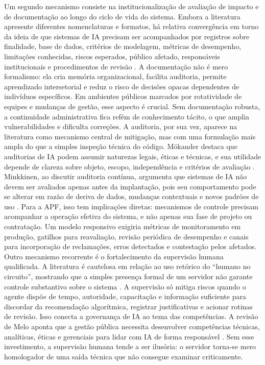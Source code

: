 \documentclass[12pt,a4paper]{article}
\begin{document}
Um segundo mecanismo consiste na institucionalização de avaliação de impacto e de documentação ao longo do ciclo de vida do sistema. Embora a literatura apresente diferentes nomenclaturas e formatos, há relativa convergência em torno da ideia de que sistemas de IA precisam ser acompanhados por registros sobre finalidade, base de dados, critérios de modelagem, métricas de desempenho, limitações conhecidas, riscos esperados, público afetado, responsáveis institucionais e procedimentos de revisão \autocite{mkander2023auditing} \autocite{minkkinen2022continuous}. A documentação não é mero formalismo: ela cria memória organizacional, facilita auditoria, permite aprendizado intersetorial e reduz o risco de decisões opacas dependentes de indivíduos específicos. Em ambientes públicos marcados por rotatividade de equipes e mudanças de gestão, esse aspecto é crucial. Sem documentação robusta, a continuidade administrativa fica refém de conhecimento tácito, o que amplia vulnerabilidades e dificulta correções.
A auditoria, por sua vez, aparece na literatura como mecanismo central de mitigação, mas com uma formulação mais ampla do que a simples inspeção técnica do código. Mökander destaca que auditorias de IA podem assumir naturezas legais, éticas e técnicas, e sua utilidade depende de clareza sobre objeto, escopo, independência e critérios de avaliação \autocite{mkander2023auditing}. Minkkinen, ao discutir auditoria contínua, argumenta que sistemas de IA não devem ser avaliados apenas antes da implantação, pois seu comportamento pode se alterar em razão de deriva de dados, mudanças contextuais e novos padrões de uso \autocite{minkkinen2022continuous}. Para a APF, isso tem implicações diretas: mecanismos de controle precisam acompanhar a operação efetiva do sistema, e não apenas sua fase de projeto ou contratação. Um modelo responsivo exigiria métricas de monitoramento em produção, gatilhos para reavaliação, revisão periódica de desempenho e canais para incorporação de reclamações, erros detectados e contestação pelos afetados.
Outro mecanismo recorrente é o fortalecimento da supervisão humana qualificada. A literatura é cautelosa em relação ao uso retórico do “humano no circuito”, mostrando que a simples presença formal de um servidor não garante controle substantivo sobre o sistema \autocite{sigfrids2022how} \autocite{parycek2023artificial}. A supervisão só mitiga riscos quando o agente dispõe de tempo, autoridade, capacitação e informação suficiente para discordar da recomendação algorítmica, registrar justificativas e acionar rotinas de revisão. Isso conecta a governança de IA ao tema das competências. A revisão de Melo aponta que a gestão pública necessita desenvolver competências técnicas, analíticas, éticas e gerenciais para lidar com IA de forma responsável \autocite{melo2026competencias}. Sem esse investimento, a supervisão humana tende a ser ilusória: o servidor torna-se mero homologador de uma saída técnica que não consegue examinar criticamente.
\end{document}
